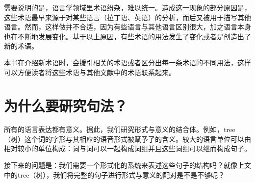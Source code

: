 需要说明的是，语言学领域里术语纷杂，难以统一。造成这一现象的部分原因是，这些术语最早来源于对某些语言（\egc 拉丁语、英语）的分析，而后又被用于描写其他语言。然而，这样做并不合适，因为有些语言与其他语言区别很大，加之语言本身也在不断地发展变化。基于以上原因，有些术语的用法发生了变化或者是创造出了新的术语。

本书在介绍新术语时，会援引相关的术语或者区分出每一条术语的不同用法，这样可以方便读者将这些术语与其他文献中的术语联系起来。

\section{为什么要研究句法？}
\label{sec-wozu-syntax}

所有的语言表达都有意义。据此，我们研究形式与意义的结合体\citep{Saussure16a}\nocite{Saussure16a-Fr}。例如，tree（树）这个词的字形与其相应的语音形式被赋予了的含义。较大的语言单位可以由相对较小的单位构成：词与词可以一起构成词组并且这些词组可以继而构成句子。

接下来的问题是：我们需要一个形式化的系统来表述这些句子的结构吗？就像上文中的tree（树），我们将完整的句子进行形式与意义的配对是不是不够呢？

